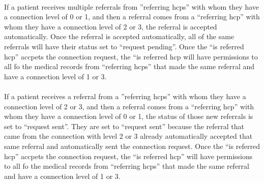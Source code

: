 \paragraph{  } If a patient receives multiple referrals from ''referring hcps'' with whom they have a connection level of 0 or 1, and then a referral comes from a ``referring hcp'' with whom they have a connection level of 2 or 3, the referral is accepted automatically.  Once the referral is accepted automatically, all of the same referrals will have their status set to ``request pending''.  Once the ``is referred hcp'' accpets the connection request, the ``is referred hcp will have permissions to all fo the medical records from ``referring hcps'' that made the same referral and have a connection level of 1 or 3.

\paragraph{  } If a patient receives a referral from a ''referring hcps'' with whom they have a connection level of 2 or 3, and then a referral comes from a ``referring hcp'' with whom they have a connection level of 0 or 1, the status of those new referrals is set to ``request sent''.  They are set to ``request sent'' because the referral that came from the connection with level 2 or 3 already automatically accepted that same referral and automatically sent the connection request.  Once the ``is referred hcp'' accpets the connection request, the ``is referred hcp'' will have permissions to all fo the medical records from ``referring hcps'' that made the same referral and have a connection level of 1 or 3.
